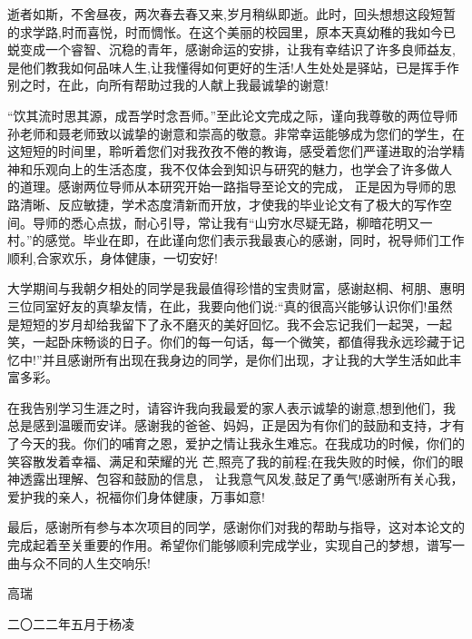 \begin{acknowledgement}

逝者如斯，不舍昼夜，两次春去春又来,岁月稍纵即逝。此时，回头想想这段短暂的求学路,时而喜悦，时而惆怅。在这个美丽的校园里，原本天真幼稚的我如今已蜕变成一个睿智、沉稳的青年，感谢命运的安排，让我有幸结识了许多良师益友,是他们教我如何品味人生,让我懂得如何更好的生活!人生处处是驿站，已是挥手作别之时，在此，向所有帮助过我的人献上我最诚挚的谢意!

“饮其流时思其源，成吾学时念吾师。”至此论文完成之际，谨向我尊敬的两位导师孙老师和聂老师致以诚挚的谢意和崇高的敬意。非常幸运能够成为您们的学生，在这短短的时间里，聆听着您们对我孜孜不倦的教诲，感受着您们严谨进取的治学精神和乐观向上的生活态度，我不仅体会到知识与研究的魅力，也学会了许多做人 的道理。感谢两位导师从本研究开始一路指导至论文的完成， 正是因为导师的思路清晰、反应敏捷，学术态度清新而开放，才使我的毕业论文有了极大的写作空间。导师的悉心点拔，耐心引导，常让我有“山穷水尽疑无路，柳暗花明又一村。”的感觉。毕业在即，在此谨向您们表示我最衷心的感谢，同时，祝导师们工作顺利,合家欢乐，身体健康，一切安好!



大学期间与我朝夕相处的同学是我最值得珍惜的宝贵财富，感谢赵桐、柯朋、惠明三位同室好友的真挚友情，在此，我要向他们说:“真的很高兴能够认识你们!虽然是短短的岁月却给我留下了永不磨灭的美好回忆。我不会忘记我们一起哭，一起笑，一起卧床畅谈的日子。你们的每一句话，每一个微笑，都值得我永远珍藏于记忆中!”并且感谢所有出现在我身边的同学，是你们出现，才让我的大学生活如此丰富多彩。

在我告别学习生涯之时，请容许我向我最爱的家人表示诚挚的谢意,想到他们，我总是感到温暖而安详。感谢我的爸爸、妈妈，正是因为有你们的鼓励和支持，才有了今天的我。你们的哺育之恩，爱护之情让我永生难忘。在我成功的时候，你们的笑容散发着幸福、满足和荣耀的光 芒,照亮了我的前程;在我失败的时候，你们的眼神透露出理解、包容和鼓励的信息， 让我意气风发,鼓足了勇气!感谢所有关心我，爱护我的亲人，祝福你们身体健康，万事如意!

最后，感谢所有参与本次项目的同学，感谢你们对我的帮助与指导，这对本论文的完成起着至关重要的作用。希望你们能够顺利完成学业，实现自己的梦想，谱写一曲与众不同的人生交响乐!

\begin{flushright}
         高瑞

二〇二二年五月于\quad 杨凌
\end{flushright}






\end{acknowledgement}
